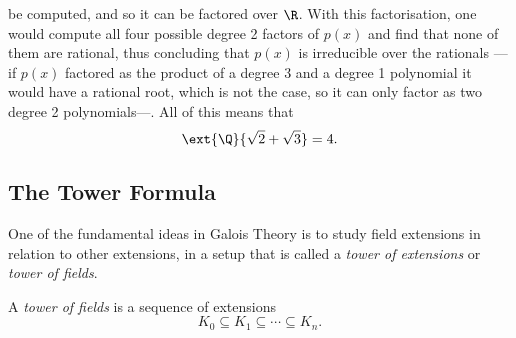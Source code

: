 \documentclass[12pt,oneside]{book}
\begin{document}
\begin{example}
\begin{points}
		be computed, and so it can be factored over \( \R \). With this factorisation, one
		would	compute all four possible degree 2 factors of \( p(x) \) and find that none of
		them are rational, thus concluding that \( p(x) \) is irreducible over the rationals
		---if \( p(x) \) factored as the product of a degree 3 and a degree 1 polynomial it
		would have a rational root, which is not the case, so it can only factor as two degree
		2 polynomials---. All of this means that
		\begin{equation*}
			\ext{\Q}{\sqrt{2}+ \sqrt{3}} = 4.
		\end{equation*}
	\end{points}
\end{example}

\subsection{The Tower Formula}
One of the fundamental ideas in Galois Theory is to study field extensions in relation to other
extensions, in a setup that is called a \emph{tower of extensions} or \emph{tower of
fields}.

\begin{definition}
	A \emph{tower of fields} is a sequence of extensions
	\begin{equation*}
		K_0 \subseteq K_1 \subseteq \cdots \subseteq K_n.
	\end{equation*}
\end{definition}
\end{document}
